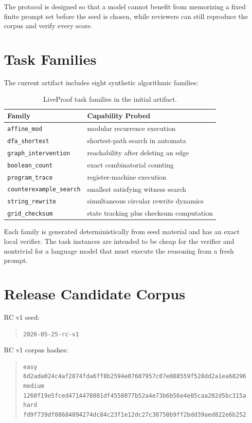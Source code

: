 \documentclass[11pt]{article}
\begin{document}
The protocol is designed so that a model cannot benefit from memorizing a fixed
finite prompt set before the seed is chosen, while reviewers can still reproduce
the corpus and verify every score.

\section{Task Families}

The current artifact includes eight synthetic algorithmic families:

\begin{table}[h]
\centering
\begin{tabular}{ll}
\toprule
Family & Capability Probed \\
\midrule
\texttt{affine\_mod} & modular recurrence execution \\
\texttt{dfa\_shortest} & shortest-path search in automata \\
\texttt{graph\_intervention} & reachability after deleting an edge \\
\texttt{boolean\_count} & exact combinatorial counting \\
\texttt{program\_trace} & register-machine execution \\
\texttt{counterexample\_search} & smallest satisfying witness search \\
\texttt{string\_rewrite} & simultaneous circular rewrite dynamics \\
\texttt{grid\_checksum} & state tracking plus checksum computation \\
\bottomrule
\end{tabular}
\caption{LiveProof task families in the initial artifact.}
\end{table}

Each family is generated deterministically from seed material and has an exact
local verifier. The task instances are intended to be cheap for the verifier and
nontrivial for a language model that must execute the reasoning from a fresh
prompt.

\section{Release Candidate Corpus}

RC v1 seed:
\begin{quote}
\texttt{2026-05-25-rc-v1}
\end{quote}

RC v1 corpus hashes:
\begin{quote}
\texttt{easy   6d2ada024c4af2874fda6ff8b2594e07607957c07e088559f528dd2a1ea68296}\\
\texttt{medium 1260f19e5fced4714478081df4558077b52a4e73b6b56e4e05caa202d5bc315a}\\
\texttt{hard   fd9f739df08684894274dc84c23f1e12dc27c30750b9ff2bdd39aed822e6b252}
\end{quote}
\end{document}
